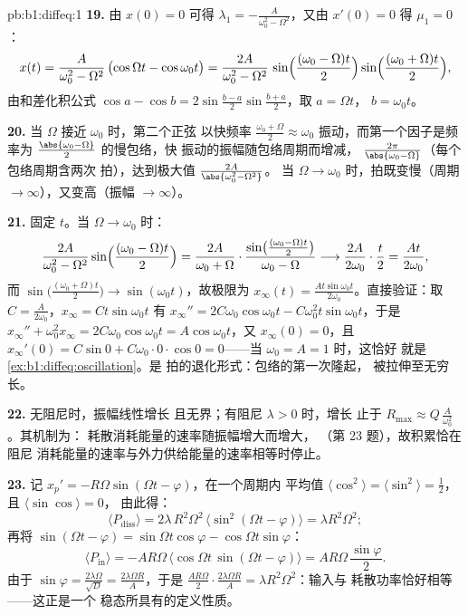 \begin{solution}{pb:b1:diffeq:1}
\textbf{19.} 由 $x(0) = 0$ 可得 $\lambda_1 = -\frac A{\omega_0^2 -
\Omega^2}$，又由 $x'(0) = 0$ 得 $\mu_1 = 0$：
\[
x(t) = \frac{A}{\omega_0^2 - \Omega^2}\,
\bigl(\cos\Omega t - \cos\omega_0 t\bigr)
= \frac{2A}{\omega_0^2 - \Omega^2}\,
\sin\Bigl(\frac{(\omega_0 - \Omega)t}2\Bigr)
\sin\Bigl(\frac{(\omega_0 + \Omega)t}2\Bigr) ,
\]
由和差化积公式 $\cos a - \cos b =
2\sin\frac{b - a}2\sin\frac{b + a}2$，取 $a = \Omega t$，
$b = \omega_0 t$。

\textbf{20.} 当 $\Omega$ 接近 $\omega_0$ 时，第二个正弦
以快频率 $\frac{\omega_0 + \Omega}2
\approx \omega_0$ 振动，而第一个因子是频率为
$\frac{\abs{\omega_0 - \Omega}}2$ 的慢包络，快
振动的振幅随包络周期而增减，
$\frac{2\pi}{\abs{\omega_0 - \Omega}}$（每个包络周期含两次
拍），达到极大值 $\frac{2A}{\abs{\omega_0^2 - \Omega^2}}$。
当 $\Omega \to \omega_0$ 时，拍既变慢（周期
$\to \infty$），又变高（振幅 $\to \infty$）。

\textbf{21.} 固定 $t$。当 $\Omega \to \omega_0$ 时：
\[
\frac{2A}{\omega_0^2 - \Omega^2}\sin\Bigl(\frac{(\omega_0 -
\Omega)t}2\Bigr)
= \frac{2A}{\omega_0 + \Omega}\cdot
\frac{\sin\bigl(\frac{(\omega_0 - \Omega)t}2\bigr)}
{\omega_0 - \Omega}
\longrightarrow \frac{2A}{2\omega_0}\cdot\frac t2
= \frac{At}{2\omega_0} ,
\]
而 $\sin\bigl(\frac{(\omega_0 + \Omega)t}2\bigr) \to
\sin(\omega_0 t)$，故极限为 $x_\infty(t) =
\frac{At\sin\omega_0 t}{2\omega_0}$。直接验证：取 $C =
\frac A{2\omega_0}$，$x_\infty = Ct\sin\omega_0 t$ 有
$x_\infty'' = 2C\omega_0\cos\omega_0 t - C\omega_0^2 t
\sin\omega_0 t$，于是 $x_\infty'' + \omega_0^2 x_\infty =
2C\omega_0\cos\omega_0 t = A\cos\omega_0 t$，又 $x_\infty(0) =
0$，且 $x_\infty'(0) = C\sin 0 + C\omega_0 \cdot 0 \cdot \cos 0 =
0$——当 $\omega_0 = A = 1$ 时，这恰好
就是\cref{ex:b1:diffeq:oscillation}。是
拍的退化形式：包络的第一次隆起，
被拉伸至无穷长。

\textbf{22.} 无阻尼时，振幅线性增长
且无界；有阻尼 $\lambda > 0$ 时，增长
止于 $R_{\max} \approx Q\,\frac A{\omega_0^2}$。其机制为：
耗散消耗能量的速率随振幅增大而增大，
（第 23 题），故积累恰在阻尼
消耗能量的速率与外力供给能量的速率相等时停止。

\textbf{23.} 记 $x_p' = -R\Omega\sin(\Omega t - \varphi)$，在一个周期内
平均值 $\langle\cos^2\rangle =
\langle\sin^2\rangle = \frac12$，且 $\langle\sin\cos\rangle = 0$，
由此得：
\[
\langle P_{\mathrm{diss}}\rangle
= 2\lambda\,R^2\Omega^2\,\langle\sin^2(\Omega t -
\varphi)\rangle = \lambda R^2\Omega^2 ;
\]
再将 $\sin(\Omega t - \varphi) = \sin\Omega t\cos\varphi
- \cos\Omega t\sin\varphi$：
\[
\langle P_{\mathrm{in}}\rangle
= -AR\Omega\,\bigl\langle\cos\Omega t\,\sin(\Omega t -
\varphi)\bigr\rangle
= AR\Omega\,\frac{\sin\varphi}2 .
\]
由于 $\sin\varphi = \frac{2\lambda\Omega}{\sqrt D} =
\frac{2\lambda\Omega R}A$，于是 $\frac{AR\Omega}2 \cdot
\frac{2\lambda\Omega R}A = \lambda R^2\Omega^2$：输入与
耗散功率恰好相等——这正是一个
稳态所具有的定义性质。


\end{solution}
